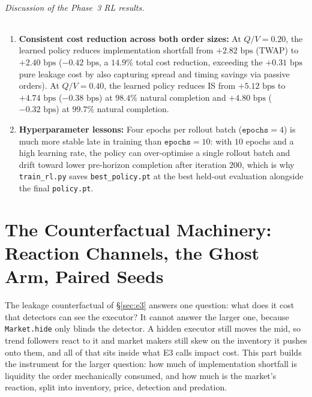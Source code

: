 \documentclass[11pt,a4paper]{article}
\newcommand{\code}[1]{\texttt{#1}}
\begin{document}
\paragraph{Discussion of the Phase~3 RL results.}
\begin{enumerate}[nosep]
\item \textbf{Consistent cost reduction across both order sizes:} At $Q/V = 0.20$, the learned policy
  reduces implementation shortfall from $+2.82\text{ bps}$ (TWAP) to $+2.40\text{ bps}$ ($-0.42\text{ bps}$,
  a $14.9\%$ total cost reduction, exceeding the $+0.31\text{ bps}$ pure leakage cost by also capturing
  spread and timing savings via passive orders). At $Q/V = 0.40$, the learned policy reduces IS from
  $+5.12\text{ bps}$ to $+4.74\text{ bps}$ ($-0.38\text{ bps}$) at $98.4\%$ natural completion and
  $+4.80\text{ bps}$ ($-0.32\text{ bps}$) at $99.7\%$ natural completion.
\item \textbf{Hyperparameter lessons:} Four epochs per rollout batch ($\code{epochs}=4$) is much more
  stable late in training than $\code{epochs}=10$: with $10$ epochs and a high learning rate, the policy
  can over-optimise a single rollout batch and drift toward lower pre-horizon completion after iteration
  $200$, which is why \code{train\_rl.py} saves \code{best\_policy.pt} at the best held-out evaluation
  alongside the final \code{policy.pt}.
\end{enumerate}

\part{The Counterfactual Machinery: Reaction Channels, the Ghost Arm, Paired Seeds}
\label{part:decomposition}

The leakage counterfactual of \S\ref{sec:e3} answers one question: what does it cost that detectors can see the
executor? It cannot answer the larger one, because \code{Market.hide} only blinds the detector. A hidden executor
still moves the mid, so trend followers react to it and market makers still skew on the inventory it pushes onto them,
and all of that sits inside what E3 calls impact cost. This part builds the instrument for the larger question:
how much of implementation shortfall is liquidity the order mechanically consumed, and how much is the market's
reaction, split into inventory, price, detection and predation.
\end{document}
